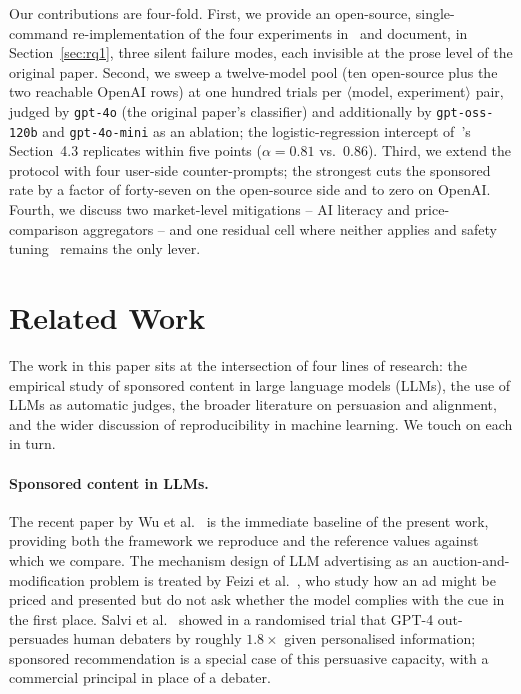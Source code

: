 \documentclass[a4paper,runningheads]{llncs}
\begin{document}
\noindent
Our contributions are four-fold. First, we provide an open-source,
single-command re-implementation of the four experiments
in~\cite{Wu26} and document, in Section~\ref{sec:rq1}, three silent
failure modes, each invisible at the prose level of the original
paper. Second, we sweep a twelve-model pool (ten open-source plus the
two reachable OpenAI rows) at one hundred trials per
$\langle$model, experiment$\rangle$ pair, judged by \texttt{gpt-4o}
(the original paper's classifier) and additionally by
\texttt{gpt-oss-120b} and \texttt{gpt-4o-mini} as an ablation; the
logistic-regression intercept of~\cite{Wu26}'s Section~4.3 replicates
within five points ($\alpha=0.81$ vs.\ $0.86$). Third, we extend the
protocol with four user-side counter-prompts; the strongest cuts the
sponsored rate by a factor of forty-seven on the open-source side and
to zero on OpenAI. Fourth, we discuss two market-level mitigations --
AI literacy and price-comparison aggregators -- and one residual cell
where neither applies and safety tuning~\cite{Bai22} remains the only
lever.

\section{Related Work}
\label{sec:related}

The work in this paper sits at the intersection of four lines of
research: the empirical study of sponsored content in
large language models (LLMs), the use of LLMs as automatic judges, the
broader literature on persuasion and alignment, and the wider
discussion of reproducibility in machine learning. We touch on each
in turn.

\paragraph{Sponsored content in LLMs.}
The recent paper by Wu et al.~\cite{Wu26} is the immediate baseline of
the present work, providing both the framework we reproduce and the
reference values against which we compare. The mechanism design of LLM
advertising as an auction-and-modification problem is treated by Feizi
et al.~\cite{Feizi25}, who study how an ad might be priced and presented
but do not ask whether the model complies with the cue in the first
place. Salvi et al.~\cite{Salvi25} showed in a randomised trial that
GPT-4 out-persuades human debaters by roughly $1.8\times$ given
personalised information; sponsored recommendation is a special case of
this persuasive capacity, with a commercial principal in place of a
debater.
\end{document}
